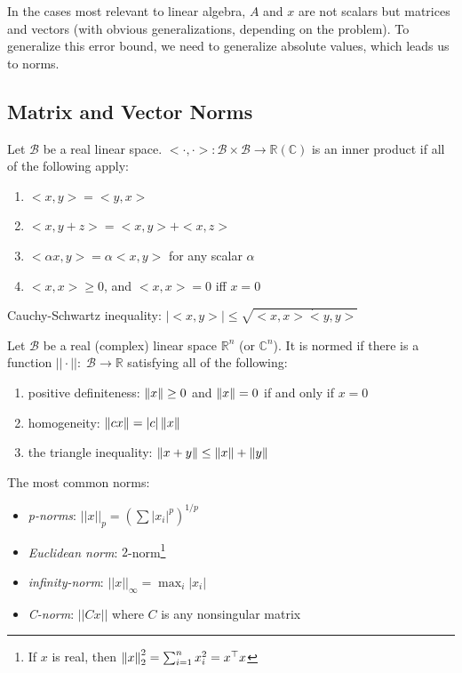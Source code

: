 \documentclass[11pt]{article}
\numberwithin{equation}{section}
\begin{document}
In the cases most relevant to linear algebra, $A$ and $x$ are not scalars but matrices and vectors (with obvious generalizations, depending on the problem). 
To generalize this error bound, we need to generalize absolute values, which leads us to norms.

\subsection{Matrix and Vector Norms}
\begin{definition}
    Let $\mathcal{B}$ be a real linear space. $<\cdot,\cdot>:\mathcal{B}\times \mathcal{B} \rightarrow \mathbb{R(C)}$ 
    is an inner product if all of the following apply:
    \begin{enumerate}
        \item $<x,y>=<y,x>$
        \item $<x,y+z>=<x,y>+<x,z>$
        \item $<\alpha x,y>=\alpha<x,y>$ for any scalar $\alpha$
        \item $<x,x>\geq 0$, and $<x,x>=0$ iff $x=0$
    \end{enumerate}
\end{definition}

\begin{lemma}
    Cauchy-Schwartz inequality: $|<x,y>|\leq \sqrt{<x,x>\dot <y,y>}$
\end{lemma}

\begin{definition}[Norm]
    Let $\mathcal{B}$ be a real (complex) linear space $\mathbb{R}^n$ (or $\mathbb{C}^n$). It is normed if there is a function $||\cdot ||:\; \mathcal{B}\rightarrow \mathbb{R}$ satisfying all of the following:
    \begin{enumerate}
        \item positive definiteness: $\left\| x \right\| \geq 0$ and $\left\| x \right\| = 0$ if and only if $x=0$
        \item homogeneity: $\left\| cx \right\| = |c| \left\| x \right\|$
        \item the triangle inequality: $\left\| x+y \right\| \leq \left\| x \right\| + \left\| y \right\|$
    \end{enumerate}
\end{definition}

\begin{savenotes}
    \begin{example}
        The most common norms:
        \begin{itemize}
            \item \textit{p-norms}: $||x||_p=(\sum |x_i|^p)^{1/p}$
            \item \textit{Euclidean norm}: $2$-norm\footnote{If $x$ is real, then $\left\| x \right\|_2^2=\sum_{i=1}^n x_i^2 = x^\top x$}
            \item \textit{infinity-norm}: $||x||_\infty=\max_i |x_i|$
            \item \textit{C-norm}: $||Cx||$ where $C$ is any nonsingular matrix
        \end{itemize}
    \end{example}
\end{savenotes}
\end{document}
